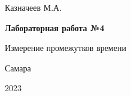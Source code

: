 \begin{titlepage}
	\begin{center}
		\Large{Казначеев М.А.}
	\end{center}
	\vspace*{\fill}
	\begin{center}
		\LARGE\textbf{Лабораторная работа №4}
		
		\addvspace{1em}
		
		\Large{Измерение промежутков времени}
		
	\end{center}
	\vspace*{\fill}
	\begin{center}
		\large{Самара}
		
		\large{2023}
	\end{center}
\end{titlepage}